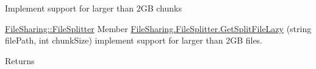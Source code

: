 
\begin{DoxyRefList}
\item[\label{todo__todo000001}%
\Hypertarget{todo__todo000001}%
Member \hyperlink{class_file_sharing_1_1_file_1_1_i_o_1_1_file_i_o_uploader_provider_aece58c355e86215e63487ad62831f33c}{File\+Sharing.File.IO.File\+I\+O\+Uploader\+Provider.Max\+Chunk\+Size} ]Implement support for larger than 2\+GB chunks 
\end{DoxyRefList}

\label{todo__todo000002}%
%
 \hyperlink{class_file_sharing_1_1_file_splitter}{File\+Sharing\+::\+File\+Splitter} Member \hyperlink{class_file_sharing_1_1_file_splitter_abc052a1ac224ba327a6380ee0d108f98}{File\+Sharing.File\+Splitter.Get\+Split\+File\+Lazy} (string file\+Path, int chunk\+Size) implement support for larger than 2\+GB files. 

\begin{DoxyReturn}{Returns}

\end{DoxyReturn}
